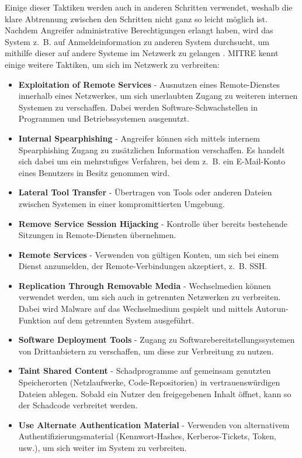 \documentclass[conference]{IEEEtran}
\begin{document}
Einige dieser Taktiken werden auch in anderen Schritten verwendet, weshalb die klare Abtrennung zwischen den Schritten nicht ganz so leicht möglich ist.
Nachdem Angreifer administrative Berechtigungen erlangt haben, wird das System z.~B. auf Anmeldeinformation zu anderen System durchsucht, um mithilfe dieser auf andere Systeme im Netzwerk zu gelangen \cite[S.~17]{Steffens2020}.
MITRE \cite{MITRELateralMovement} kennt einige weitere Taktiken, um sich im Netzwerk zu verbreiten:
\begin{itemize}
    \item \textbf{Exploitation of Remote Services} - Ausnutzen eines Remote-Dienstes innerhalb eines Netzwerkes, um sich unerlaubten Zugang zu weiteren internen Systemen zu verschaffen. Dabei werden Software-Schwachstellen in Programmen und Betriebssystemen ausgenutzt.
    \item \textbf{Internal Spearphishing} - Angreifer können sich mittels internem Spearphishing Zugang zu zusätzlichen Information verschaffen. Es handelt sich dabei um ein mehrstufiges Verfahren, bei dem z.~B. ein E-Mail-Konto eines Benutzers in Besitz genommen wird.
    \item \textbf{Lateral Tool Transfer} - Übertragen von Tools oder anderen Dateien zwischen Systemen in einer kompromittierten Umgebung.
    \item \textbf{Remove Service Session Hijacking} - Kontrolle über bereits bestehende Sitzungen in Remote-Diensten übernehmen.
    \item \textbf{Remote Services} - Verwenden von gültigen Konten, um sich bei einem Dienst anzumelden, der Remote-Verbindungen akzeptiert, z.~B. SSH.
    \item \textbf{Replication Through Removable Media} - Wechselmedien können verwendet werden, um sich auch in getrennten Netzwerken zu verbreiten. Dabei wird Malware auf das Wechselmedium gespielt und mittels Autorun-Funktion auf dem getrennten System ausgeführt.
    \item \textbf{Software Deployment Tools} - Zugang zu Softwarebereitstellungssystemen von Drittanbietern zu verschaffen, um diese zur Verbreitung zu nutzen.
    \item \textbf{Taint Shared Content} - Schadprogramme auf gemeinsam genutzten Speicherorten (Netzlaufwerke, Code-Repositorien) in vertrauenswürdigen Dateien ablegen. Sobald ein Nutzer den freigegebenen Inhalt öffnet, kann so der Schadcode verbreitet werden.
    \item \textbf{Use Alternate Authentication Material} - Verwenden von alternativem Authentifizierungsmaterial (Kennwort-Hashes, Kerberos-Tickets, Token, usw.), um sich weiter im System zu verbreiten.
\end{itemize}
\end{document}
